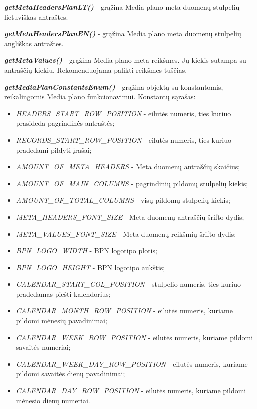 \textit{\textbf{getMetaHeadersPlanLT()}} - grąžina Media plano meta duomenų stulpelių lietuviškas antraštes. 

\textit{\textbf{getMetaHeadersPlanEN()}} - grąžina Media plano meta duomenų stulpelių angliškas antraštes.  

\textit{\textbf{getMetaValues()}} - grąžina Media plano meta reikšmes. Jų kiekis sutampa su antraščių kiekiu. Rekomenduojama palikti reikšmes tuščias. 

\textit{\textbf{getMediaPlanConstantsEnum()}} - grąžina objektą su konstantomis, reikalingomis Media plano funkcionavimui. Konstantų sąrašas:
\begin{itemize}
    \itemsep0em 
    \item \textit{HEADERS\_START\_ROW\_POSITION} - eilutės numeris, ties kuriuo prasideda pagrindinės antraštės;
    \item \textit{RECORDS\_START\_ROW\_POSITION} - eilutės numeris, ties kuriuo pradedami pildyti įrašai;
    \item \textit{AMOUNT\_OF\_META\_HEADERS} - Meta duomenų antraščių skaičius;
    \item \textit{AMOUNT\_OF\_MAIN\_COLUMNS} - pagrindinių pildomų stulpelių kiekis;
    \item \textit{AMOUNT\_OF\_TOTAL\_COLUMNS} - visų pildomų stulpelių kiekis;
    \item \textit{META\_HEADERS\_FONT\_SIZE} - Meta duomenų antraščių šrifto dydis;
    \item \textit{META\_VALUES\_FONT\_SIZE} - Meta duomenų reikšmių šrifto dydis;
    \item \textit{BPN\_LOGO\_WIDTH} - BPN logotipo plotis;
    \item \textit{BPN\_LOGO\_HEIGHT} - BPN logotipo aukštis;
    \item \textit{CALENDAR\_START\_COL\_POSITION} - stulpelio numeris, ties kuriuo pradedamas piešti kalendorius;
    \item \textit{CALENDAR\_MONTH\_ROW\_POSITION} - eilutės numeris, kuriame pildomi mėnesių pavadinimai;
    \item \textit{CALENDAR\_WEEK\_ROW\_POSITION} - eilutės numeris, kuriame pildomi savaitės numeriai;
    \item \textit{CALENDAR\_WEEK\_DAY\_ROW\_POSITION} - eilutės numeris, kuriame pildomi savaitės dienų pavadinimai;
    \item \textit{CALENDAR\_DAY\_ROW\_POSITION} - eilutės numeris, kuriame pildomi mėnesio dienų numeriai.
\end{itemize}


